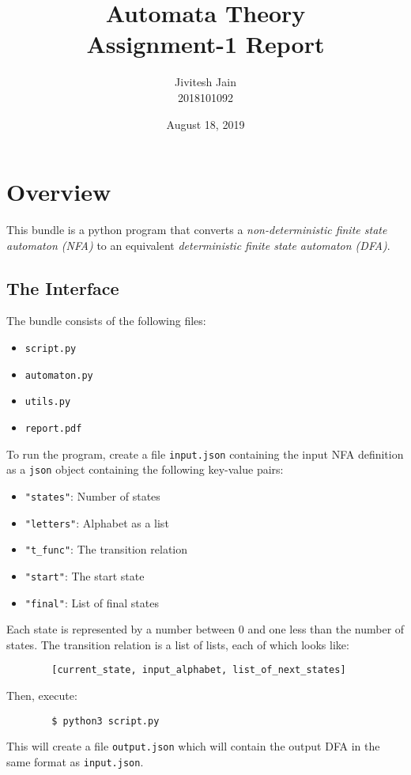 \documentclass[12pt]{scrreprt}
\title{Automata Theory\\Assignment-1 Report}
\author{Jivitesh Jain\\2018101092}
\date{August 18, 2019}
\begin{document}
\maketitle
    
\chapter{Overview}
    This bundle is a python program that converts a \emph{non-deterministic finite state automaton (NFA)} to an equivalent \emph{deterministic finite state automaton (DFA)}.
    
    \section{The Interface}
    
    The bundle consists of the following files:
    \begin{itemize}
        \item \texttt{script.py}
        \item \texttt{automaton.py}
        \item \texttt{utils.py}
        \item \texttt{report.pdf} 
    \end{itemize}
    To run the program, create a file \texttt{input.json} containing the input NFA definition as a \texttt{json} object containing the following key-value pairs:
    \begin{itemize}
        \item \texttt{"states"}: Number of states
        \item \texttt{"letters"}: Alphabet as a list
        \item \texttt{"t_func"}: The transition relation
        \item \texttt{"start"}: The start state
        \item \texttt{"final"}: List of final states
    \end{itemize}
    Each state is represented by a number between 0 and one less than the number of states. The transition relation is a list of lists, each of which looks like:
    \begin{verbatim}
        [current_state, input_alphabet, list_of_next_states]
    \end{verbatim}
    Then, execute:
    \begin{verbatim}
        $ python3 script.py
    \end{verbatim}
    This will create a file \texttt{output.json} which will contain the output DFA in the same format as \texttt{input.json}.
\end{document}
